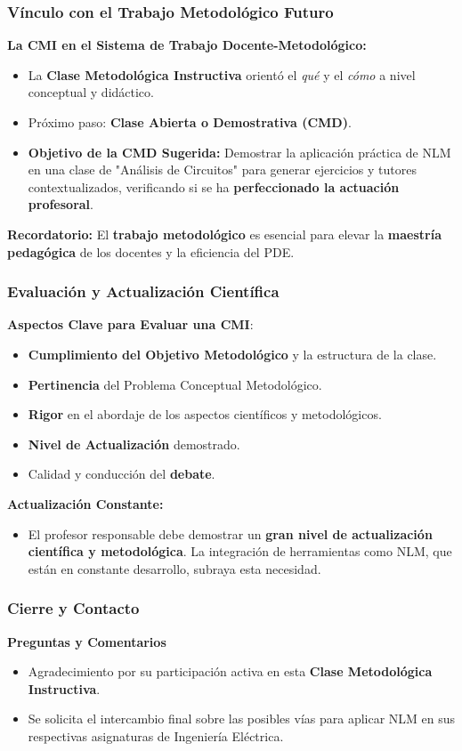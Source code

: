\documentclass[aspectratio=43]{beamer}
\begin{document}
\begin{frame}
\frametitle{ Vínculo con el Trabajo Metodológico Futuro}

\textbf{La CMI en el Sistema de Trabajo Docente-Metodológico:}
\begin{itemize}
    \item La \textbf{Clase Metodológica Instructiva} orientó el \textit{qué} y el \textit{cómo} a nivel conceptual y didáctico.
    \item Próximo paso: \textbf{Clase Abierta o Demostrativa (CMD)}.
    \item \textbf{Objetivo de la CMD Sugerida:} Demostrar la aplicación práctica de NLM en una clase de "Análisis de Circuitos" para generar ejercicios y tutores contextualizados, verificando si se ha \textbf{perfeccionado la actuación profesoral}.
\end{itemize}
\vfill
\textbf{Recordatorio:} El \textbf{trabajo metodológico} es esencial para elevar la \textbf{maestría pedagógica} de los docentes y la eficiencia del PDE.
\end{frame}

\begin{frame}
\frametitle{ Evaluación y Actualización Científica}

\textbf{Aspectos Clave para Evaluar una CMI}:
\begin{itemize}
    \item \textbf{Cumplimiento del Objetivo Metodológico} y la estructura de la clase.
    \item \textbf{Pertinencia} del Problema Conceptual Metodológico.
    \item \textbf{Rigor} en el abordaje de los aspectos científicos y metodológicos.
    \item \textbf{Nivel de Actualización} demostrado.
    \item Calidad y conducción del \textbf{debate}.
\end{itemize}
\vfill
\textbf{Actualización Constante:}
\begin{itemize}
    \item El profesor responsable debe demostrar un \textbf{gran nivel de actualización científica y metodológica}. La integración de herramientas como NLM, que están en constante desarrollo, subraya esta necesidad.
\end{itemize}
\end{frame}

\begin{frame}
\frametitle{ Cierre y Contacto}
\begin{center}
\textbf{\Huge{Preguntas y Comentarios}}
\end{center}
\vfill
\begin{itemize}
    \item Agradecimiento por su participación activa en esta \textbf{Clase Metodológica Instructiva}.
    \item Se solicita el intercambio final sobre las posibles vías para aplicar NLM en sus respectivas asignaturas de Ingeniería Eléctrica.
\end{itemize}
\end{frame}
\end{document}

